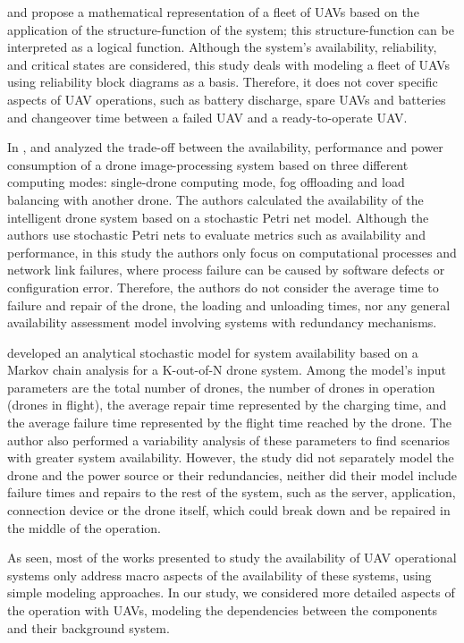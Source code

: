\documentclass[conference]{IEEEtran}
\begin{document}
\citet{Zaitseva2020} and \citet{rusnak2019reliability} propose a mathematical representation of a fleet of UAVs based on the application of the structure-function of the system; this structure-function can be interpreted as a logical function. Although the system’s availability, reliability, and critical states are considered, this study deals with modeling a fleet of UAVs using reliability block diagrams as a basis. Therefore, it does not cover specific aspects of UAV operations, such as battery discharge, spare UAVs and batteries and changeover time between a failed UAV and a ready-to-operate UAV.

In \citet{Machida2021}, and \citet{Report} analyzed the trade-off between the availability, performance and power consumption of a drone image-processing system based on three different computing modes: single-drone computing mode, fog offloading and load balancing with another drone. The authors calculated the availability of the intelligent drone system based on a stochastic Petri net model. Although the authors use stochastic Petri nets to evaluate metrics such as availability and performance, in this study the authors only focus on computational processes and network link failures, where process failure can be caused by software defects or configuration error. Therefore, the authors do not consider the average time to failure and repair of the drone, the loading and unloading times, nor any general availability assessment model involving systems with redundancy mechanisms.

\citet{Maccarthy2019} developed an analytical stochastic model for system availability based on a Markov chain analysis for a K-out-of-N drone system. Among the model’s input parameters are the total number of drones, the number of drones in operation (drones in flight), the average repair time represented by the charging time, and the average failure time represented by the flight time reached by the drone. The author also performed a variability analysis of these parameters to find scenarios with greater system availability. However, the study did not separately model the drone and the power source or their redundancies, neither did their model include failure times and repairs to the rest of the system, such as the server, application, connection device or the drone itself, which could break down and be repaired in the middle of the operation.

As seen, most of the works presented to study the availability of UAV operational systems only address macro aspects of the availability of these systems, using simple modeling approaches. In our study, we considered more detailed aspects of the operation with UAVs, modeling the dependencies between the components and their background system. 
\end{document}
